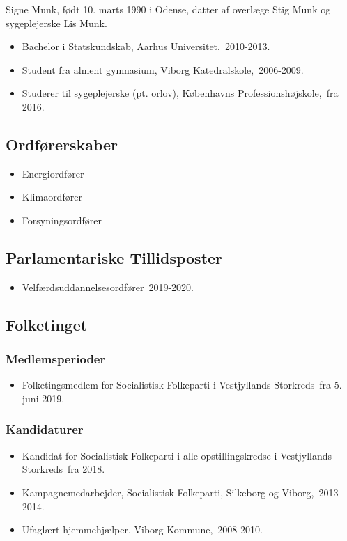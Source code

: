 \documentclass[11pt, a4paper]{awesome-cv}
\begin{document}
\makecvheader[R]
\makelettertitle
\begin{cvletter}
Signe Munk, født 10. marts 1990 i Odense, datter af overlæge Stig Munk og sygeplejerske Lis Munk.

\begin{itemize}
\item Bachelor i Statskundskab, Aarhus Universitet, 2010-2013.
\item Student fra alment gymnasium, Viborg Katedralskole, 2006-2009.
\item Studerer til sygeplejerske (pt. orlov), Københavns Professionshøjskole, fra 2016.
\end{itemize}
\subsection*{Ordførerskaber}
\begin{itemize}
\item Energiordfører
\item Klimaordfører
\item Forsyningsordfører
\end{itemize}
\subsection*{Parlamentariske Tillidsposter}
\begin{itemize}
\item Velfærdsuddannelsesordfører 2019-2020.
\end{itemize}
\subsection*{Folketinget}
\subsubsection*{Medlemsperioder}
\begin{itemize}
\item Folketingsmedlem for Socialistisk Folkeparti i Vestjyllands Storkreds fra 5. juni 2019.
\end{itemize}
\subsubsection*{Kandidaturer}
\begin{itemize}
\item Kandidat for Socialistisk Folkeparti i alle opstillingskredse i Vestjyllands Storkreds fra 2018.
\end{itemize}
\begin{itemize}
\item Kampagnemedarbejder, Socialistisk Folkeparti, Silkeborg og Viborg, 2013-2014.
\item Ufaglært hjemmehjælper, Viborg Kommune, 2008-2010.
\end{itemize}
\end{cvletter}
\end{document}
